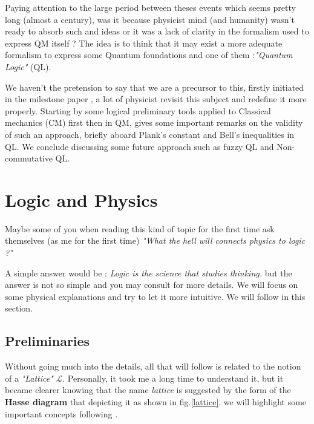 \documentclass[12pt]{article}
\begin{document}
\vspace{0.3cm}
Paying attention to the large period between theses events which seems pretty long (almost a century), was it because physicist mind (and humanity) wasn't ready to absorb such and ideas or it was a lack of clarity in the formalism used to express QM itself ? The idea is to think that it may exist a more adequate formalism to express some Quantum foundations and one of them :\textit{"Quantum Logic"} (QL).

\vspace{0.3cm}
We haven't the pretension to say that we are a precursor to this, firstly initiated in the milestone paper \cite{Birkhoff}, a lot of physicist revisit this subject and redefine it more properly. Starting by some logical preliminary tools applied to Classical mechanics (CM) first then in QM, gives some important remarks on the validity of such an approach, briefly aboard Plank's constant and Bell's inequalities in QL. We conclude discussing some future approach such as fuzzy QL and Non-commutative QL.

\vspace{-0.3cm}
\section{Logic and Physics}
\vspace{-0.2cm}

Maybe some of you when reading this kind of topic for the first time ask themselves (as me for the first time) \textit{"What the hell will connects physics to logic ?"}

A simple answer would be : \textit{Logic is the science that studies thinking.} but the answer is not so simple and you may consult \cite{fuzzy3,logic} for more details. We will focus on some physical explanations and try to let it more intuitive. We will follow \cite{fuzzy3,david,isham,mackey,one,two} in this section.

\vspace{-0.4cm}
\subsection{Preliminaries}

Without going much into the details, all that will follow is related to the notion of a \textit{"Lattice"} $\mathcal{L}$. Personally, it took me a long time to understand it, but it became clearer knowing that the name \textit{lattice} is suggested by the form of the \textbf{Hasse diagram} that depicting it as shown in fig.\ref{lattice}. we will highlight some important concepts following \cite{david,fuzzy3,pavicic1999non}. 
\end{document}
